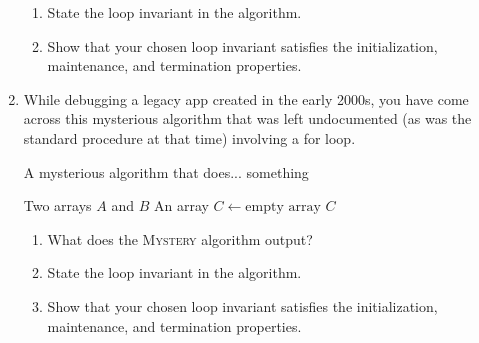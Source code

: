 \begin{exercises}
\begin{enumerate}
        \begin{enumerate}
            \item State the loop invariant in the algorithm.
            \item Show that your chosen loop invariant satisfies the initialization, maintenance, and termination properties.
        \end{enumerate}

        \item While debugging a legacy app created in the early 2000s, you have come across this mysterious algorithm that was left undocumented (as was the standard procedure at that time) involving a for loop.
            \begin{algorithm}[H]
                \caption{A mysterious algorithm that does... something}
                \begin{algorithmic}[1]
                    \Require Two arrays $A$ and $B$
                    \Ensure An array
                        \State $C \gets \text{empty array}$
                                \State {}
                            \EndIf
                        \EndFor
                        \Return $C$
                    \EndFunction
                \end{algorithmic}
            \end{algorithm}
            
        \begin{enumerate}
            \item What does the \textsc{Mystery} algorithm output?
            \item State the loop invariant in the algorithm.
            \item Show that your chosen loop invariant satisfies the initialization, maintenance, and termination properties.
        \end{enumerate}
                        

\end{enumerate}
\end{exercises}
